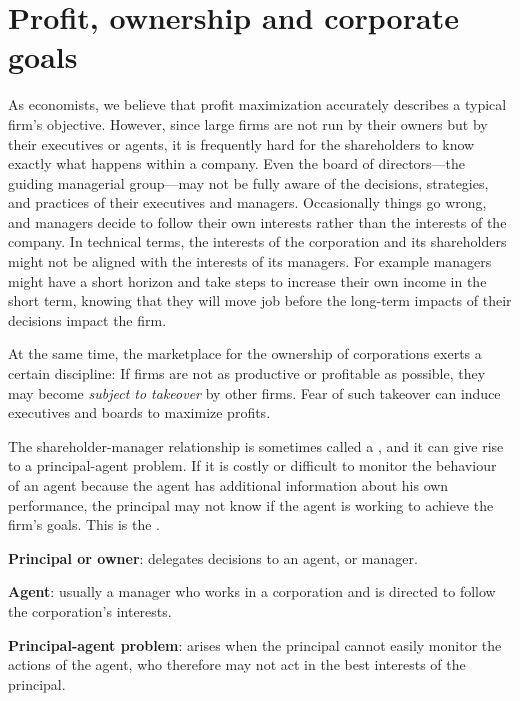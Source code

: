 \section{Profit, ownership and corporate goals}\label{sec:ch7sec2}

As economists, we believe that profit maximization accurately describes a typical firm's objective. However, since large firms are not run by their owners but by their executives or agents, it is frequently hard for the shareholders to know exactly what happens within a company. Even the board of directors---the guiding managerial group---may not be fully aware of the decisions, strategies, and practices of their executives and managers. Occasionally things go wrong, and managers decide to follow their own interests rather than the interests of the company. In technical terms, the interests of the corporation and its shareholders might not be aligned with the interests of its managers. For example managers might have a short horizon and take steps to increase their own income in the short term, knowing that they will move job before the long-term impacts of their decisions impact the firm. 

At the same time, the marketplace for the ownership of corporations exerts a certain discipline: If firms are not as productive or profitable as possible, they may become \textit{subject to takeover} by other firms. Fear of such takeover can induce executives and boards to maximize profits. 

The shareholder-manager relationship is sometimes called a , and it can give rise to a principal-agent problem. If it is costly or difficult to monitor the behaviour of an agent because the agent has additional information about his own performance, the principal may not know if the agent is working to achieve the firm's goals. This is the . 

\begin{DefBox}
\textbf{Principal or owner}: delegates decisions to an agent, or manager.

\textbf{Agent}: usually a manager who works in a corporation and is directed to follow the corporation's interests.

\textbf{Principal-agent problem}: arises when the principal cannot easily monitor the actions of the agent, who therefore may not act in the best interests of the principal.
\end{DefBox}

